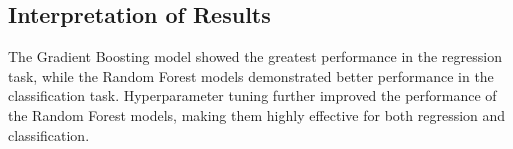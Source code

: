 \subsection{Interpretation of Results}
The Gradient Boosting model showed the greatest performance in the regression task, while the Random Forest models demonstrated better performance in the classification task. Hyperparameter tuning further improved the performance of the Random Forest models, making them highly effective for both regression and classification.




